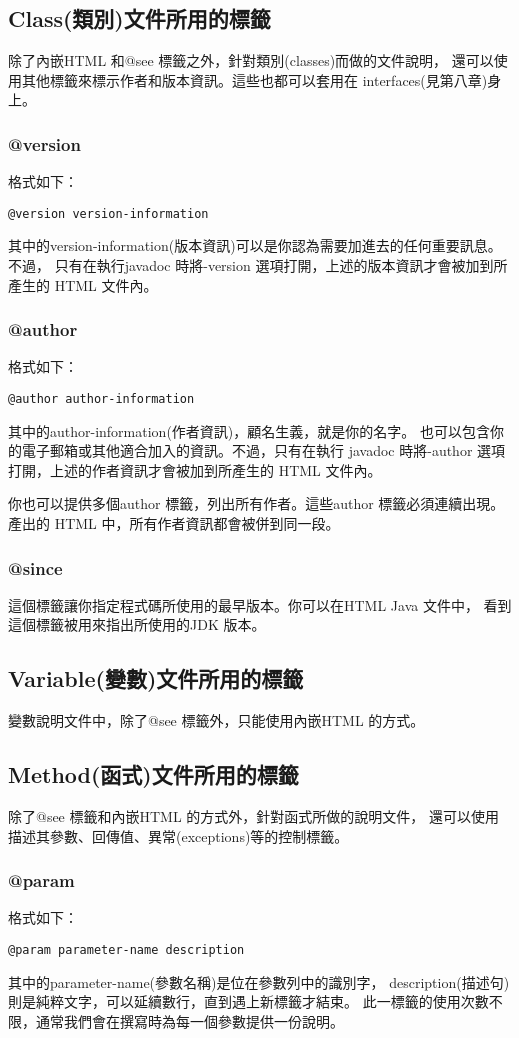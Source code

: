 \subsection{Class(類別)文件所用的標籤}
除了內嵌HTML 和@see 標籤之外，針對類別(classes)而做的文件說明，
還可以使用其他標籤來標示作者和版本資訊。這些也都可以套用在
interfaces(見第八章)身上。
\subsubsection{@version}
格式如下：
\begin{Verbatim}[frame=single]
@version version-information
\end{Verbatim}
其中的version-information(版本資訊)可以是你認為需要加進去的任何重要訊息。不過，
只有在執行javadoc 時將-version 選項打開，上述的版本資訊才會被加到所產生的
HTML 文件內。
\subsubsection{@author}
格式如下：
\begin{Verbatim}[frame=single]
@author author-information
\end{Verbatim}
其中的author-information(作者資訊)，顧名生義，就是你的名字。
也可以包含你的電子郵箱或其他適合加入的資訊。不過，只有在執行
javadoc 時將-author 選項打開，上述的作者資訊才會被加到所產生的
HTML 文件內。

你也可以提供多個author 標籤，列出所有作者。這些author 標籤必須連續出現。產出的
HTML 中，所有作者資訊都會被併到同一段。


\subsubsection{@since}
這個標籤讓你指定程式碼所使用的最早版本。你可以在HTML Java 文件中，
看到這個標籤被用來指出所使用的JDK 版本。

\subsection{Variable(變數)文件所用的標籤}
變數說明文件中，除了@see 標籤外，只能使用內嵌HTML 的方式。
\subsection{Method(函式)文件所用的標籤}
除了@see 標籤和內嵌HTML 的方式外，針對函式所做的說明文件，
還可以使用描述其參數、回傳值、異常(exceptions)等的控制標籤。
\subsubsection{@param}
格式如下：
\begin{Verbatim}[frame=single]
@param parameter-name description
\end{Verbatim}
其中的parameter-name(參數名稱)是位在參數列中的識別字，
description(描述句)則是純粹文字，可以延續數行，直到遇上新標籤才結束。
此一標籤的使用次數不限，通常我們會在撰寫時為每一個參數提供一份說明。
